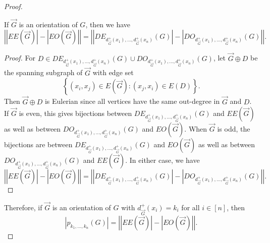 \documentclass{amsbook}
\theoremstyle{plain}
\numberwithin{equation}{chapter}
\newcommand{\setb}[3]{\left\{ #1 \in #2 : #3 \right\}}
\newcommand{\card}[1]{\left|#1\right|}
\newcommand{\irange}[1]{\left[#1\right]}
\begin{document}
\begin{proof}
\begin{EulerianOrientationsLemma}
If $\vec{G}$ is an orientation of $G$, then we have
\[\card{|EE(\vec{G})| - |EO(\vec{G})|} = \card{|DE_{d_{\vec{G}}^+(x_1), \ldots, d_{\vec{G}}^+(x_n)}(G)|- |DO_{d_{\vec{G}}^+(x_1), \ldots, d_{\vec{G}}^+(x_n)}(G)|}.\]
\end{EulerianOrientationsLemma}
\begin{proof}
	For $D \in DE_{d_{\vec{G}}^+(x_1), \ldots, d_{\vec{G}}^+(x_n)}(G) \cup DO_{d_{\vec{G}}^+(x_1), \ldots, d_{\vec{G}}^+(x_n)}(G)$, let $\vec{G} \oplus D$ be the spanning subgraph of $\vec{G}$ with edge set 
	\[\setb{(x_i,x_j)}{E(\vec{G})}{(x_j,x_i) \in E(D)}.\]
	Then $\vec{G} \oplus D$ is Eulerian since all vertices have the same out-degree in $\vec{G}$ and $D$.  If $\vec{G}$ is even, this gives bijections between $DE_{d_{\vec{G}}^+(x_1), \ldots, d_{\vec{G}}^+(x_n)}(G)$ and $EE(\vec{G})$ as well as between $DO_{d_{\vec{G}}^+(x_1), \ldots, d_{\vec{G}}^+(x_n)}(G)$ and $EO(\vec{G})$.  When $\vec{G}$ is odd, the bijections are between $DE_{d_{\vec{G}}^+(x_1), \ldots, d_{\vec{G}}^+(x_n)}(G)$ and $EO(\vec{G})$ as well as between $DO_{d_{\vec{G}}^+(x_1), \ldots, d_{\vec{G}}^+(x_n)}(G)$ and $EE(\vec{G})$.  In either case, we have
\[\card{|EE(\vec{G})| - |EO(\vec{G})|} = \card{|DE_{d_{\vec{G}}^+(x_1), \ldots, d_{\vec{G}}^+(x_n)}(G)|- |DO_{d_{\vec{G}}^+(x_1), \ldots, d_{\vec{G}}^+(x_n)}(G)|}.\]
\end{proof} 
Therefore, if $\vec{G}$ is an orientation of $G$ with $d_{\vec{G}}^+(x_i) = k_i$ for all $i \in \irange{n}$, then
\[|p_{k_1, \ldots, k_n}(G)| = \card{|EE(\vec{G})| - |EO(\vec{G})|}.\]


\end{proof}
\end{document}

